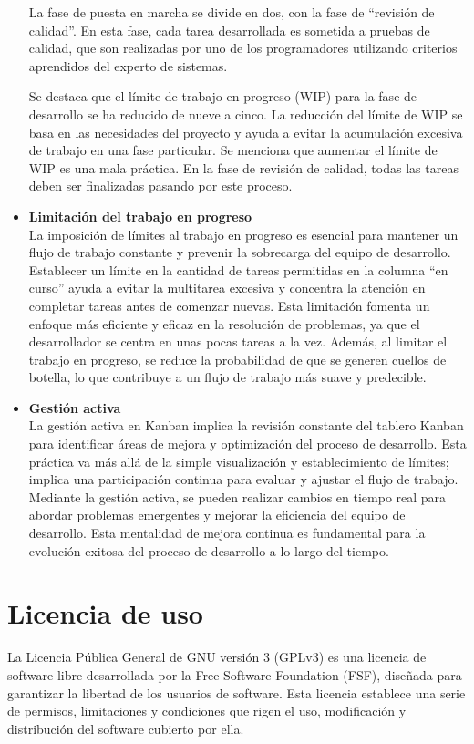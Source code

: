 \begin{itemize}
  La fase de puesta en marcha se divide en dos, con la fase de ``revisión de calidad''. En esta fase, cada tarea desarrollada es sometida a pruebas de calidad, que son realizadas por uno de los programadores utilizando criterios aprendidos del experto de sistemas.
  
  Se destaca que el límite de trabajo en progreso (WIP) para la fase de desarrollo se ha reducido de nueve a cinco. La reducción del límite de WIP se basa en las necesidades del proyecto y ayuda a evitar la acumulación excesiva de trabajo en una fase particular. Se menciona que aumentar el límite de WIP es una mala práctica. En la fase de revisión de calidad, todas las tareas deben ser finalizadas pasando por este proceso. \parencite{Bermejo2010}

  \item \textbf{Limitación del trabajo en progreso} \\
  La imposición de límites al trabajo en progreso es esencial para mantener un flujo de trabajo constante y prevenir la sobrecarga del equipo de desarrollo. Establecer un límite en la cantidad de tareas permitidas en la columna ``en curso'' ayuda a evitar la multitarea excesiva y concentra la atención en completar tareas antes de comenzar nuevas. Esta limitación fomenta un enfoque más eficiente y eficaz en la resolución de problemas, ya que el desarrollador se centra en unas pocas tareas a la vez. Además, al limitar el trabajo en progreso, se reduce la probabilidad de que se generen cuellos de botella, lo que contribuye a un flujo de trabajo más suave y predecible. \parencite{Anderson2010}

  \item \textbf{Gestión activa} \\
  La gestión activa en Kanban implica la revisión constante del tablero Kanban para identificar áreas de mejora y optimización del proceso de desarrollo. Esta práctica va más allá de la simple visualización y establecimiento de límites; implica una participación continua para evaluar y ajustar el flujo de trabajo. Mediante la gestión activa, se pueden realizar cambios en tiempo real para abordar problemas emergentes y mejorar la eficiencia del equipo de desarrollo. Esta mentalidad de mejora continua es fundamental para la evolución exitosa del proceso de desarrollo a lo largo del tiempo. \parencite{Anderson2010}
\end{itemize}

\section{Licencia de uso}
La Licencia Pública General de GNU versión 3 (GPLv3) es una licencia de software libre desarrollada por la Free Software Foundation (FSF), diseñada para garantizar la libertad de los usuarios de software. Esta licencia establece una serie de permisos, limitaciones y condiciones que rigen el uso, modificación y distribución del software cubierto por ella. \parencite{GNU2021}

